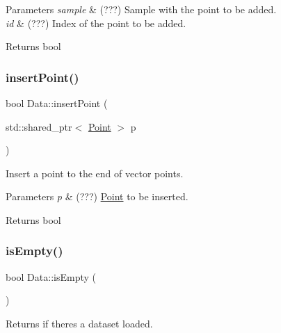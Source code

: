 \begin{DoxyParams}{Parameters}
{\em sample} & (???) Sample with the point to be added. \\
\hline
{\em id} & (???) Index of the point to be added. \\
\hline
\end{DoxyParams}
\begin{DoxyReturn}{Returns}
bool 
\end{DoxyReturn}
\mbox{\label{class_data_a4dcec7d15085d451cf46a0459fab9f46}} 
\subsubsection{\texorpdfstring{insert\+Point()}{insertPoint()}\hspace{0.1cm}{\footnotesize\ttfamily [2/2]}}
{\footnotesize\ttfamily bool Data\+::insert\+Point (\begin{DoxyParamCaption}\item[{std\+::shared\+\_\+ptr$<$ \hyperlink{class_point}{Point} $>$}]{p }\end{DoxyParamCaption})}



Insert a point to the end of vector points. 


\begin{DoxyParams}{Parameters}
{\em p} & (???) \hyperlink{class_point}{Point} to be inserted. \\
\hline
\end{DoxyParams}
\begin{DoxyReturn}{Returns}
bool 
\end{DoxyReturn}
\mbox{\label{class_data_a93468d3b8b2ce0f73e369e5de160534e}} 
\subsubsection{\texorpdfstring{is\+Empty()}{isEmpty()}}
{\footnotesize\ttfamily bool Data\+::is\+Empty (\begin{DoxyParamCaption}{ }\end{DoxyParamCaption})}



Returns if there\textquotesingle{}s a dataset loaded. 


